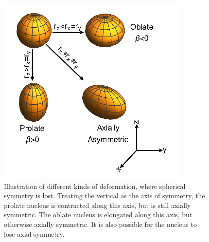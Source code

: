 \begin{figure}
    \centering
    \includegraphics[scale=1]{Introduction_Figs/Deformation.png}
    \caption{Illustration of different kinds of deformation, where spherical symmetry is lost. Treating the vertical as the axis of symmetry, the prolate nucleus is contracted along this axis, but is still axially symmetric. The oblate nucleus is elongated along this axis, but otherwise axially symmetric. It is also possible for the nucleus to lose axial symmetry.}
    \label{fig:deformation}
\end{figure}